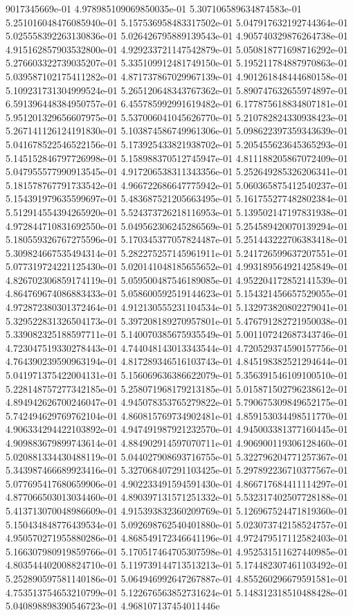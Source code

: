 9017345669e-01	4.978985109069850035e-01	5.307106589634874583e-01	5.251016048476085940e-01	5.157536958483317502e-01	5.047917632192744364e-01	5.025558392263130836e-01	5.026426795889139543e-01	4.905740329876264738e-01	4.915162857903532800e-01	4.929233721147542879e-01	5.050818771698716292e-01	5.276603322739035207e-01	5.335109912481749150e-01	5.195211784887970863e-01	5.039587102175411282e-01	4.871737867029967139e-01	4.901261848444680158e-01	5.109231731304999524e-01	5.265120648343767362e-01	5.890747632655974897e-01	6.591396448384950757e-01	6.455785992991619482e-01	6.177875618834807181e-01	5.951201329656607975e-01	5.537006041045626770e-01	5.210782824330938423e-01	5.267141126124191830e-01	5.103874586749961306e-01	5.098622397359343639e-01	5.041678522546522156e-01	5.173925433821938702e-01	5.205455623645365293e-01	5.145152846797726998e-01	5.158988370512745947e-01	4.811188205867072409e-01	5.047955577990913545e-01	4.917206538311343356e-01	5.252649285326206341e-01	5.181578767791733542e-01	4.966722686647775942e-01	5.060365875412540237e-01	5.154391979635599697e-01	5.483687521205663495e-01	5.161755277482802384e-01	5.512914554394265920e-01	5.524373726218116953e-01	5.139502147197831938e-01	4.972844710831692550e-01	5.049562306245286569e-01	5.254589420070139294e-01	5.180559326767275596e-01	5.170345377057824487e-01	5.251443222706383418e-01	5.309824667535494314e-01	5.282275257145961911e-01	5.241726599637207551e-01	5.077319724221125430e-01	5.020141048185655652e-01	4.993189564921425849e-01	4.826702306859174119e-01	5.059500487546189085e-01	4.952204172852141539e-01	4.864769674086883433e-01	5.058600592519144623e-01	5.154321456657529055e-01	4.972872380301372464e-01	4.912130555231104534e-01	5.132973820802279041e-01	5.329522831326504173e-01	5.397208189270957801e-01	5.476791282721950038e-01	5.339082325188597711e-01	5.140070385675935549e-01	5.001107242687343746e-01	4.723047519330278443e-01	4.744048143013343544e-01	4.720529374590157756e-01	4.764390239590963194e-01	4.817289346516103743e-01	4.845198382521294644e-01	5.041971375422004131e-01	5.156069636386622079e-01	5.356391546109100510e-01	5.228148757277342185e-01	5.258071968179213185e-01	5.015871502796238612e-01	4.894942626700246047e-01	4.945078353765279822e-01	5.790675309849652175e-01	5.742494629769762104e-01	4.860815769734902481e-01	4.859153034498511770e-01	4.906334294422103892e-01	4.947491987921232570e-01	4.945003381377160445e-01	4.909883679899743614e-01	4.884902914597070711e-01	4.906900119306128460e-01	5.020881334430488119e-01	5.044027908693716755e-01	5.322796204771257367e-01	5.343987466689923416e-01	5.327068407291103425e-01	5.297892236710377567e-01	5.077695417680659906e-01	4.902233491594591430e-01	4.866717684411114297e-01	4.877066503013034460e-01	4.890397131571251332e-01	5.532317402507728188e-01	5.413713070048986609e-01	4.915393832360209769e-01	5.126967524471819360e-01	5.150434848776439534e-01	5.092698762540401880e-01	5.023073742158524757e-01	4.950570271955880286e-01	4.868549172346641196e-01	4.972479517112582403e-01	5.166307980919859766e-01	5.170517464705307598e-01	4.952531511627440985e-01	4.803544402008824710e-01	5.119739144713513213e-01	5.174482307461103492e-01	5.252890597581140186e-01	5.064946992647267887e-01	4.855260296679591581e-01	4.753513754653210799e-01	5.122676563852731624e-01	5.148312318510488428e-01	5.040898898390546723e-01	4.968107137454011446e